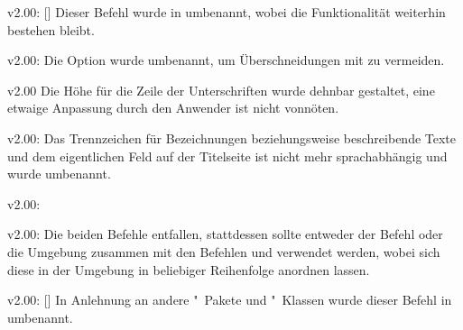 \begin{Obsolete}{v2.00:}
  {[]}
\printobsoletelist%
%
Dieser Befehl wurde in  umbenannt, wobei die Funktionalität 
weiterhin bestehen bleibt.
\end{Obsolete}

\begin{Obsolete}{v2.00:}
  {}
\printobsoletelist%
%
Die Option wurde umbenannt, um Überschneidungen mit  zu 
vermeiden.
\end{Obsolete}

\begin{Obsolete}{v2.00}
  {}
\printobsoletelist%
%
Die Höhe für die Zeile der Unterschriften wurde dehnbar gestaltet, eine etwaige 
Anpassung durch den Anwender ist nicht vonnöten.
\end{Obsolete}

\begin{Obsolete}{v2.00:}
  {}%
\printobsoletelist%
%
Das Trennzeichen für Bezeichnungen beziehungsweise beschreibende Texte und dem 
eigentlichen Feld auf der Titelseite ist nicht mehr sprachabhängig und wurde 
umbenannt.
\end{Obsolete}

\begin{Obsolete}{v2.00:}
  {}
\begin{Obsolete}{v2.00:}
  {}
\printobsoletelist%
%
Die beiden Befehle entfallen, stattdessen sollte entweder der Befehl 
 oder die Umgebung  zusammen 
mit den Befehlen  und  verwendet 
werden, wobei sich diese in der Umgebung in beliebiger Reihenfolge anordnen 
lassen.
\end{Obsolete}
\end{Obsolete}

\begin{Obsolete}{v2.00:}
  {[]}
\printobsoletelist%
%
In Anlehnung an andere "~Pakete und "~Klassen wurde 
dieser Befehl in  umbenannt.
\end{Obsolete}

